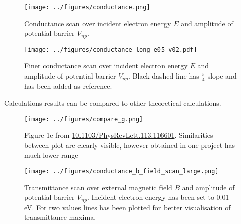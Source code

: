 \documentclass{beamer}
\begin{document}
\begin{frame}
    \begin{figure}
        \begin{center}
            \texttt{[image: ../figures/conductance.png]}
        \end{center}
        \caption{Conductance scan over incident electron energy $E$ and amplitude of potential barrier $V_{np}$.}
    \end{figure}
\end{frame}

\begin{frame}
    \begin{figure}
        \begin{center}
            \texttt{[image: ../figures/conductance\_long\_e05\_v02.pdf]}
        \end{center}
        \caption{Finer conductance scan over incident electron energy $E$ and amplitude of potential barrier $V_{np}$. Black dashed line has $\frac{\pi}{4}$ slope and has been added as reference.}
    \end{figure}
\end{frame}

\begin{frame}
    Calculations results can be compared to other theoretical calculations.
    \begin{figure}
        \begin{center}
            \texttt{[image: ../figures/compare\_g.png]}
        \end{center}
        \caption{Figure 1e from \url{10.1103/PhysRevLett.113.116601}. Similarities between plot are clearly visible, however obtained in one project has much lower range}
    \end{figure}
\end{frame}

\begin{frame}
    \begin{figure}
        \begin{center}
            \texttt{[image: ../figures/conductance\_b\_field\_scan\_large.png]}
        \end{center}
        \caption{Transmittance scan over external magnetic field $B$ and amplitude of potential barrier $V_{np}$. Incident electron energy has been set to 0.01 eV. For two values lines has been plotted for better visualisation of transmittance maxima.}
    \end{figure}
\end{frame}
\end{document}
